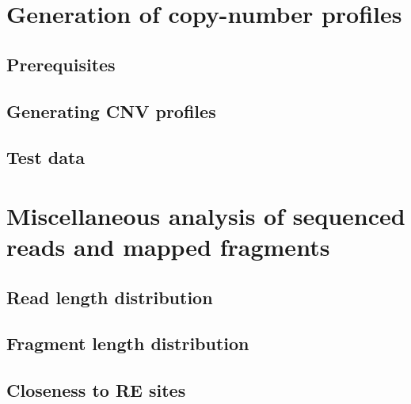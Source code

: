 \documentclass[11pt]{article}
\begin{document}
\section{Generation of copy-number profiles}

\subsection{Prerequisites}

\subsection{Generating CNV profiles}

\subsection{Test data}


\section{Miscellaneous analysis of sequenced reads and mapped fragments}

\subsection{Read length distribution}

\subsection{Fragment length distribution}

\subsection{Closeness to RE sites}


\end{document}
